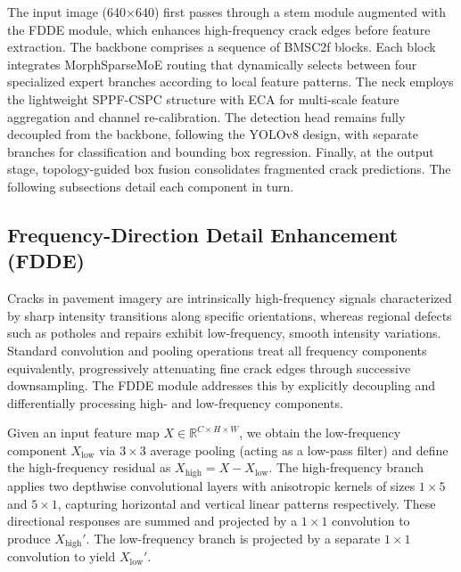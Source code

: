 \documentclass{ieeeaccess}
\begin{document}
The input image (640$\times$640) first passes through a stem module augmented with the FDDE module, which enhances high-frequency crack edges before feature extraction. The backbone comprises a sequence of BMSC2f blocks. Each block integrates MorphSparseMoE routing that dynamically selects between four specialized expert branches according to local feature patterns. The neck employs the lightweight SPPF-CSPC structure with ECA for multi-scale feature aggregation and channel re-calibration. The detection head remains fully decoupled from the backbone, following the YOLOv8 design, with separate branches for classification and bounding box regression. Finally, at the output stage, topology-guided box fusion consolidates fragmented crack predictions. The following subsections detail each component in turn.

\subsection{Frequency-Direction Detail Enhancement (FDDE)}

Cracks in pavement imagery are intrinsically high-frequency signals characterized by sharp intensity transitions along specific orientations, whereas regional defects such as potholes and repairs exhibit low-frequency, smooth intensity variations. Standard convolution and pooling operations treat all frequency components equivalently, progressively attenuating fine crack edges through successive downsampling. The FDDE module addresses this by explicitly decoupling and differentially processing high- and low-frequency components.

Given an input feature map $X \in \mathbb{R}^{C \times H \times W}$, we obtain the low-frequency component $X_{\text{low}}$ via $3\times3$ average pooling (acting as a low-pass filter) and define the high-frequency residual as $X_{\text{high}} = X - X_{\text{low}}$. The high-frequency branch applies two depthwise convolutional layers with anisotropic kernels of sizes $1\times5$ and $5\times1$, capturing horizontal and vertical linear patterns respectively. These directional responses are summed and projected by a $1\times1$ convolution to produce $X_{\text{high}}'$. The low-frequency branch is projected by a separate $1\times1$ convolution to yield $X_{\text{low}}'$.
\end{document}

